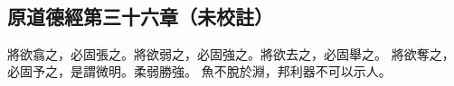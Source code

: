 ﻿%
%

\chapter{~}

\section{原道德經第三十六章（未校註）}

\begin{withgezhu}

\zhsong


\textcolor{tongjia-color}{將欲翕之，必固張之。將欲弱之，必固強之。將欲去之，必固舉之。}
\textcolor{tongjia-color}{將欲奪之，必固予之，是謂微明}。柔弱勝強。
魚不脫於淵，\textcolor{tongjia-color}{邦}利器不可以示人。

\end{withgezhu}
